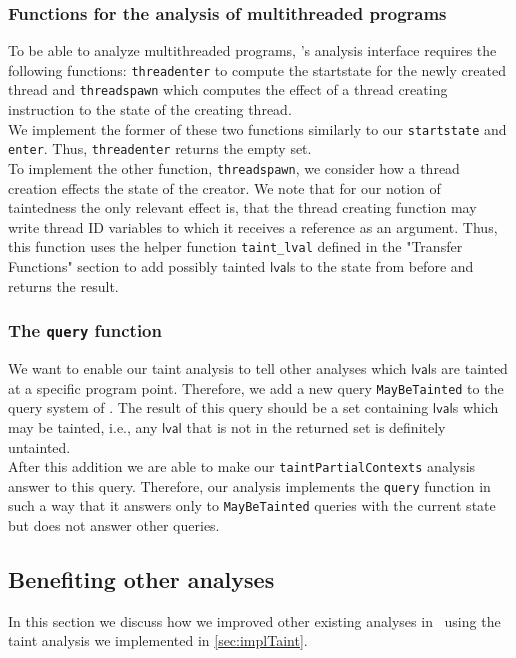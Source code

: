       \subsubsection{Functions for the analysis of multithreaded programs}
        To be able to analyze multithreaded programs, \gob's analysis interface requires the following functions: \texttt{threadenter} to compute the startstate for the newly created thread and \texttt{threadspawn} which computes the effect of a thread creating instruction to the state of the creating thread.\\
        We implement the former of these two functions similarly to our \texttt{startstate} and \texttt{enter}. Thus, \texttt{threadenter} returns the empty set.\\
        To implement the other function, \texttt{threadspawn}, we consider how a thread creation effects the state of the creator. We note that for our notion of taintedness the only relevant effect is, that the thread creating function may write thread ID variables to which it receives a reference as an argument. Thus, this function uses the helper function \texttt{taint\_lval} defined in the "Transfer Functions" section to add possibly tainted $\textsf{lval}$s to the state from before and returns the result.

      \subsubsection{The \texttt{query} function}
        We want to enable our taint analysis to tell other analyses which $\textsf{lval}$s are tainted at a specific program point. Therefore, we add a new query \texttt{MayBeTainted} to the query system of \gob. The result of this query should be a set containing $\textsf{lval}$s which may be tainted, i.e., any $\textsf{lval}$ that is not in the returned set is definitely untainted.\\
        After this addition we are able to make our \texttt{taintPartialContexts} analysis answer to this query. Therefore, our analysis implements the \texttt{query} function in such a way that it answers only to \texttt{MayBeTainted} queries with the current state but does not answer other queries.

    \subsection{Benefiting other analyses}\label{sec:improveVariableAnalyses}
    In this section we discuss how we improved other existing analyses in \gob\ using the taint analysis we implemented in \autoref{sec:implTaint}.
